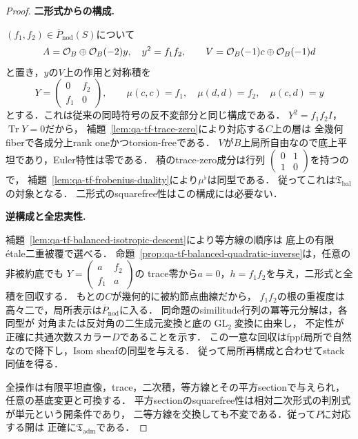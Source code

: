 \begin{proof}
\par\medskip\noindent\textbf{二形式からの構成.}\par\nobreak\smallskip
$(f_1,f_2)\in\overline P_{\mathrm{nod}}(S)$について
\[
 A=\mathcal O_B\oplus\mathcal O_B(-2)y,\quad y^2=f_1f_2,
 \qquad V=\mathcal O_B(-1)c\oplus\mathcal O_B(-1)d
\]
と置き，$y$の$V$上の作用と対称積を
\[
 Y=\begin{pmatrix}0&f_2\\f_1&0\end{pmatrix},\qquad
 \mu(c,c)=f_1,\quad\mu(d,d)=f_2,\quad\mu(c,d)=y
\]
とする．これは従来の同時符号の反不変部分と同じ構成である．
$Y^2=f_1f_2I$，$\operatorname{Tr}Y=0$だから，
補題~\ref{lem:qa-tf-trace-zero}により対応する$C$上の層は
全幾何fiberで各成分上rank oneかつtorsion-freeである．
$V$が$B$上局所自由なので底上平坦であり，Euler特性は零である．
積のtrace-zero成分は行列
$\left(\begin{smallmatrix}0&1\\1&0\end{smallmatrix}\right)$を持つので，
補題~\ref{lem:qa-tf-frobenius-duality}により$\mu^\flat$は同型である．
従ってこれは$\mathfrak T_{\mathrm{bal}}$の対象となる．
二形式のsquarefree性はこの構成には必要ない．

\par\medskip\noindent\textbf{逆構成と全忠実性.}\par\nobreak\smallskip
補題~\ref{lem:qa-tf-balanced-isotropic-descent}により等方線の順序は
底上の有限\'etale二重被覆で選べる．
命題~\ref{prop:qa-tf-balanced-quadratic-inverse}は，任意の非被約底でも
$Y=\left(\begin{smallmatrix}a&f_2\\f_1&a\end{smallmatrix}\right)$の
trace零から$a=0$，$h=f_1f_2$を与え，二形式と全積を回収する．
もとの$C$が幾何的に被約節点曲線だから，
$f_1f_2$の根の重複度は高々二で，局所表示は$\overline P_{\mathrm{nod}}$に入る．
同命題のsimilitude行列の冪等元分解は，各同型が
対角または反対角の二生成元変換と底の$\operatorname{GL}_2$変換に由来し，
不定性が正確に共通次数スカラー$D$であることを示す．
この一意な回収はfppf局所で自然なので降下し，Isom sheafの同型を与える．
従って局所再構成と合わせてstack同値を得る．

全操作は有限平坦直像，trace，二次積，等方線とその平方sectionで与えられ，
任意の基底変更と可換する．
平方sectionのsquarefree性は相対二次形式の判別式が単元という開条件であり，
二等方線を交換しても不変である．従って$P$に対応する開は
正確に$\mathfrak T_{\mathrm{adm}}$である．
\end{proof}

